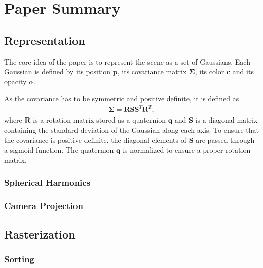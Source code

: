 

\section{Paper Summary}

\subsection{Representation}
The core idea of the paper is to represent the scene as a set of Gaussians.
Each Gaussian is defined by its position $\bm{p}$, its covariance matrix $\bm{\Sigma}$, its color $\bm{c}$ and its opacity $\alpha$.

As the covariance has to be symmetric and positive definite, it is defined as
\begin{align}
    \bm{\Sigma} = \bm{R} \bm{S} \bm{S}^T \bm{R}^T,
\end{align}
where $\bm{R}$ is a rotation matrix stored as a quaternion $\bm{q}$ and $\bm{S}$ is a diagonal matrix containing the standard deviation of the Gaussian along each axis.
To ensure that the covariance is positive definite, the diagonal elements of $\bm{S}$ are passed through a sigmoid function.
The quaternion $\bm{q}$ is normalized to ensure a proper rotation matrix.



\subsubsection{Spherical Harmonics}


\subsubsection{Camera Projection}
\subsection{Rasterization}
\subsubsection{Sorting}
